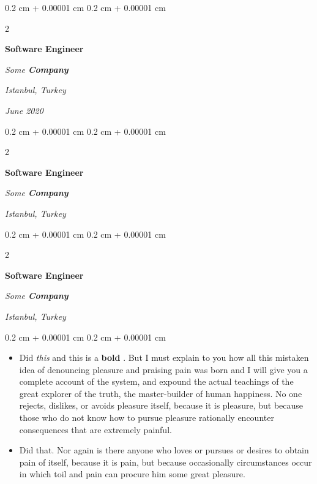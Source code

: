 \documentclass[10pt, letterpaper]{article}
\newenvironment{highlights}{
    \begin{itemize}[
        topsep=0.10 cm,
        parsep=0.10 cm,
        partopsep=0pt,
        itemsep=0pt,
        leftmargin=0.4 cm + 10pt
    ]
}{
    \end{itemize}
} %
\newenvironment{onecolentry}{
    \begin{adjustwidth}{
        0.2 cm + 0.00001 cm
    }{
        0.2 cm + 0.00001 cm
    }
}{
    \end{adjustwidth}
} %
\newenvironment{twocolentry}[2][]{
    \onecolentry
    \def\secondColumn{#2}
    \setcolumnwidth{\fill, 4.5 cm}
    \begin{paracol}{2}
}{
    \switchcolumn \raggedleft \secondColumn
    \end{paracol}
    \endonecolentry
} %
\let\hrefWithoutArrow\href
\renewcommand{\href}[2]{\hrefWithoutArrow{#1}{\ifthenelse{\equal{#2}{}}{ }{#2 }\raisebox{.15ex}{\footnotesize \faExternalLink*}}}
\begin{document}
        \vspace{0.2 cm}

        \begin{twocolentry}{
        \textit{Istanbul, Turkey}    
            
        \textit{June 2020}}
            \textbf{Software Engineer}
            
            \textit{Some \textbf{Company}}
        \end{twocolentry}



        \vspace{0.2 cm}

        \begin{twocolentry}{
        \textit{Istanbul, Turkey}    
            
        }
            \textbf{Software Engineer}
            
            \textit{Some \textbf{Company}}
        \end{twocolentry}



        \vspace{0.2 cm}

        \begin{twocolentry}{
        \textit{Istanbul, Turkey}    
            
        }
            \textbf{Software Engineer}
            
            \textit{Some \textbf{Company}}
        \end{twocolentry}

        \vspace{0.10 cm}
        \begin{onecolentry}
            \begin{highlights}
                \item Did \textit{this} and this is a \textbf{bold} \href{https://example.com}{link}. But I must explain to you how all this mistaken idea of denouncing pleasure and praising pain was born and I will give you a complete account of the system, and expound the actual teachings of the great explorer of the truth, the master-builder of human happiness. No one rejects, dislikes, or avoids pleasure itself, because it is pleasure, but because those who do not know how to pursue pleasure rationally encounter consequences that are extremely painful.
                \item Did that. Nor again is there anyone who loves or pursues or desires to obtain pain of itself, because it is pain, but because occasionally circumstances occur in which toil and pain can procure him some great pleasure.
            \end{highlights}
        \end{onecolentry}
\end{document}
